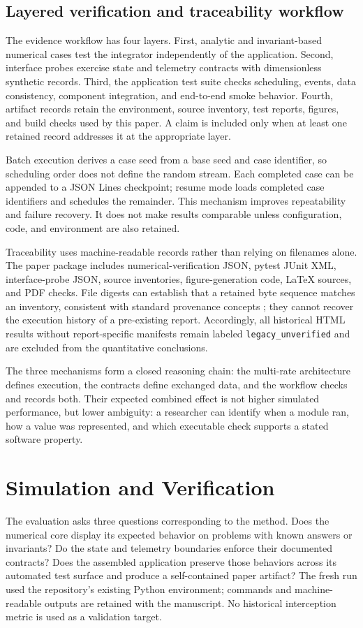 \documentclass[11pt,a4paper]{article}
\newcommand{\code}[1]{\texttt{#1}}
\begin{document}
\subsection{Layered verification and traceability workflow}
\label{sec:traceability}
The evidence workflow has four layers. First, analytic and invariant-based numerical cases test the integrator independently of the application. Second, interface probes exercise state and telemetry contracts with dimensionless synthetic records. Third, the application test suite checks scheduling, events, data consistency, component integration, and end-to-end smoke behavior. Fourth, artifact records retain the environment, source inventory, test reports, figures, and build checks used by this paper. A claim is included only when at least one retained record addresses it at the appropriate layer.

Batch execution derives a case seed from a base seed and case identifier, so scheduling order does not define the random stream. Each completed case can be appended to a JSON Lines checkpoint; resume mode loads completed case identifiers and schedules the remainder. This mechanism improves repeatability and failure recovery. It does not make results comparable unless configuration, code, and environment are also retained.

Traceability uses machine-readable records rather than relying on filenames alone. The paper package includes numerical-verification JSON, pytest JUnit XML, interface-probe JSON, source inventories, figure-generation code, LaTeX sources, and PDF checks. File digests can establish that a retained byte sequence matches an inventory, consistent with standard provenance concepts \citep{moreau2013,nist2015}; they cannot recover the execution history of a pre-existing report. Accordingly, all historical HTML results without report-specific manifests remain labeled \code{legacy\_unverified} and are excluded from the quantitative conclusions.

The three mechanisms form a closed reasoning chain: the multi-rate architecture defines execution, the contracts define exchanged data, and the workflow checks and records both. Their expected combined effect is not higher simulated performance, but lower ambiguity: a researcher can identify when a module ran, how a value was represented, and which executable check supports a stated software property.

\section{Simulation and Verification}
The evaluation asks three questions corresponding to the method. Does the numerical core display its expected behavior on problems with known answers or invariants? Do the state and telemetry boundaries enforce their documented contracts? Does the assembled application preserve those behaviors across its automated test surface and produce a self-contained paper artifact? The fresh run used the repository's existing Python environment; commands and machine-readable outputs are retained with the manuscript. No historical interception metric is used as a validation target.
\end{document}
